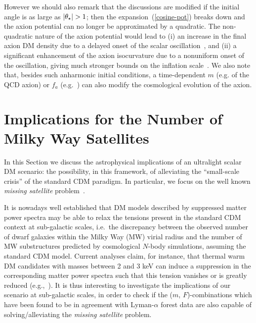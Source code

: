 \documentclass[11pt,nofootinbib]{article}
\numberwithin{equation}{section}
\begin{document}
However we should also remark that the discussions are modified if the
initial angle is as large as $\lvert\theta_\star \rvert > 1$;
then the expansion~(\ref{cosine-pot}) breaks down and the axion
potential can no longer be approximated by a quadratic.
The non-quadratic nature of the axion potential would lead to
(i) an increase in the final axion DM density due
to a delayed onset of the scalar
oscillation~\cite{Turner:1985si,Bae:2008ue}, and (ii) a significant 
enhancement of the axion isocurvature due to a nonuniform onset of the oscillation,
giving much stronger bounds on the inflation
scale~\cite{Lyth:1991ub,Strobl:1994wk,Kobayashi:2013nva}.
We also note that, besides such anharmonic initial conditions,
a time-dependent $m$ (e.g. of the QCD axion)
or $f_a$ (e.g.~\cite{Linde:1990yj,Linde:1991km,Higaki:2014ooa,Chun:2014xva,Fairbairn:2014zta,Kobayashi:2016qld}) can also modify the cosmological
evolution of the axion.


\section{Implications for the Number of Milky Way Satellites}
\label{astro}


In this Section we discuss the astrophysical implications of an
ultralight scalar DM scenario: the possibility, in this framework, of alleviating the ``small-scale crisis'' of the standard CDM paradigm. In particular, we focus on the well known {\emph{missing satellite}} problem~\cite{Klypin:1999uc,Moore:1999nt}. 

It is nowadays well established that DM models described by suppressed matter power spectra may be able to relax the tensions present in the standard CDM context at sub-galactic scales, i.e.~the discrepancy between the observed number of dwarf galaxies within the Milky Way (MW) virial radius and the number of MW substructures predicted by cosmological $N$-body simulations, assuming the standard CDM model.
Current analyses claim, for instance, that thermal warm DM candidates with masses between 2 and 3 keV can induce a suppression in the corresponding matter power spectra such that this tension vanishes or is greatly reduced (e.g.,~\cite{lovell,lovell2}).
It is thus interesting to investigate the implications of our scenario
at sub-galactic scales, in order to check if the ($m$, $F$)-combinations which have been found to be in agreement with Lyman-$\alpha$ forest data are also capable of solving/alleviating the {\emph{missing satellite}} problem.
\end{document}
